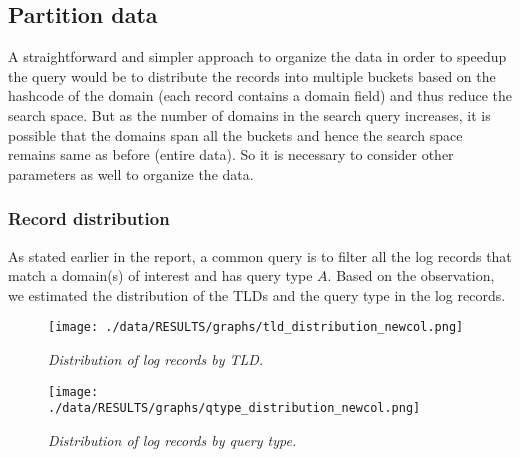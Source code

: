\documentclass[11pt,a4paper]{article}
\begin{document}
\subsection{Partition data}
A straightforward and simpler approach to organize the data in order to speedup the query would be to distribute the records into multiple buckets based on the hashcode of the domain (each record contains a domain field) and thus reduce the search space. But as the number of domains in the search query increases, it is possible that the domains span all the buckets and hence the search space remains same as before (entire data). So it is necessary to consider other parameters as well to organize the data.

\subsubsection{Record distribution}
As stated earlier in the report, a common query is to filter all the log records that match a domain(s) of interest and has query type $A$. Based on the observation, we estimated the distribution of the TLDs and the query type in the log records.

\begin{figure}[h] 
\texttt{[image: ./data/RESULTS/graphs/tld\_distribution\_newcol.png]}
\caption {\textit{Distribution of log records by TLD.}}
\end{figure}

\begin{figure}[H] 
\centering
\texttt{[image: ./data/RESULTS/graphs/qtype\_distribution\_newcol.png]}
\caption {\textit{Distribution of log records by query type.}}
\end{figure}
\end{document}
